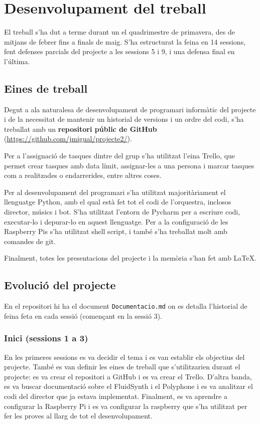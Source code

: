 \documentclass[a4paper]{paper}
\let\oldsection\section
\renewcommand\section{\clearpage\oldsection}
\begin{document}
\section{Desenvolupament del treball}
El treball s'ha dut a terme durant un el quadrimestre de primavera, des de mitjans de febrer fins a finals de maig. S'ha estructurat la feina en 14 sessions, fent defenses parcials del projecte a les sessions 5 i 9, i una defensa final en l'última.

\subsection{Eines de treball}
Degut a ala naturalesa de desenvolupament de programari informàtic del projecte i de la necessitat de mantenir un historial de versions i un ordre del codi, s'ha treballat amb un \textbf{repositori públic de GitHub} (\url{https://github.com/jmigual/projecte2/}).

Per a l'assignació de tasques dintre del grup s'ha utilitzat l'eina Trello\cite{trello}, que permet crear tasques amb data límit, assignar-les a una persona i marcar tasques com a realitzades o endarrerides, entre altres coses.

Per al desenvolupament del programari s'ha utilitzat majoritàriament el llenguatge Python\cite{python}, amb el qual està fet tot el codi de l'orquestra, inclosos director, músics i bot. S'ha utilitzat l'entorn de Pycharm\cite{pycharm} per a escriure codi, executar-lo i depurar-lo en aquest llenguatge. Per a la configuració de les Raspberry Pis s'ha utilitzat shell script, i també s'ha treballat molt amb comandes de git.

Finalment, totes les presentacions del projecte i la memòria s'han fet amb \LaTeX.

\subsection{Evolució del projecte}
En el repositori hi ha el document \texttt{Documentacio.md} on es detalla l'historial de feina feta en cada sessió (començant en la sessió 3).

\subsubsection{Inici (sessions 1 a 3)}
En les primeres sessions es va decidir el tema i es van establir els objectius del projecte. També es van definir les eines de treball que s'utilitzarien durant el projecte: es va crear el repositori a GitHub i es va crear el Trello. D'altra banda, es va buscar documentació sobre el FluidSynth i el Polyphone i es va analitzar el codi del director que ja estava implementat. Finalment, es va aprendre a configurar la Raspberry Pi i es va configurar la raspberry que s'ha utilitzat per fer les proves al llarg de tot el desenvolupament.
\end{document}
